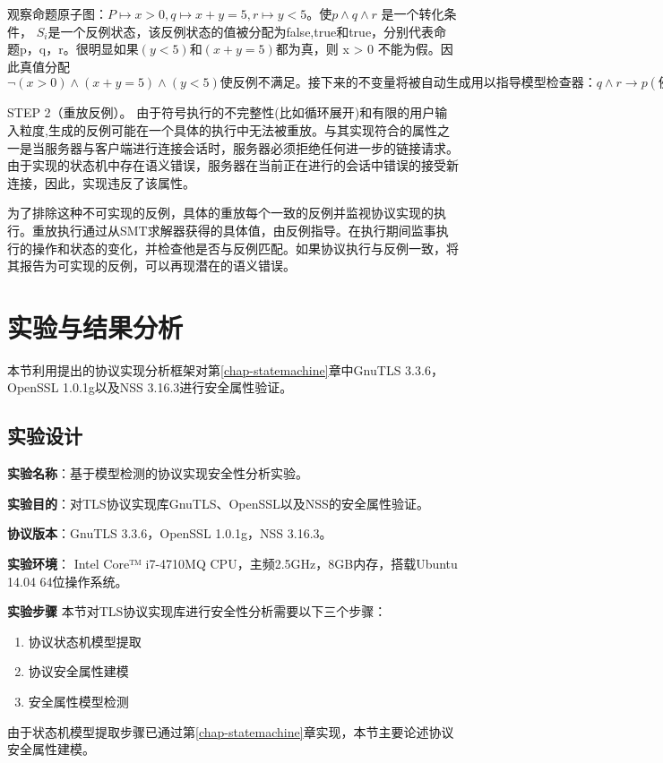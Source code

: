 观察命题原子图：$P \mapsto {x > 0}, q \mapsto {x + y = 5}, r \mapsto {y < 5}。使 p \land q \land r$ 是一个转化条件， $S_i$是一个反例状态，该反例状态的值被分配为false,true和true，分别代表命题p，q，r。很明显如果$(y < 5) 和 (x + y = 5)$都为真，则 x > 0 不能为假。因此真值分配$ \neg(x > 0)\land(x+y=5)\land(y<5)使反例不满足。接下来的不变量将被自动生成用以指导模型检查器：q \land r \to p (例如当q和r都被设置为true时，p必须被设为true)。$

STEP 2（重放反例）。 由于符号执行的不完整性(比如循环展开)和有限的用户输入粒度,生成的反例可能在一个具体的执行中无法被重放。与其实现符合的属性之一是当服务器与客户端进行连接会话时，服务器必须拒绝任何进一步的链接请求。由于实现的状态机中存在语义错误，服务器在当前正在进行的会话中错误的接受新连接，因此，实现违反了该属性。

为了排除这种不可实现的反例，具体的重放每个一致的反例并监视协议实现的执行。重放执行通过从SMT求解器获得的具体值，由反例指导。在执行期间监事执行的操作和状态的变化，并检查他是否与反例匹配。如果协议执行与反例一致，将其报告为可实现的反例，可以再现潜在的语义错误。


\section{实验与结果分析}
本节利用提出的协议实现分析框架对第\ref{chap-statemachine}章中GnuTLS 3.3.6，OpenSSL 1.0.1g以及NSS 3.16.3进行安全属性验证。
\subsection{实验设计}
\textbf{实验名称}：基于模型检测的协议实现安全性分析实验。

\textbf{实验目的}：对TLS协议实现库GnuTLS、OpenSSL以及NSS的安全属性验证。

\textbf{协议版本}：GnuTLS 3.3.6，OpenSSL 1.0.1g，NSS 3.16.3。

\textbf{实验环境}：
Intel Core™ i7-4710MQ CPU，主频2.5GHz，8GB内存，搭载Ubuntu 14.04 64位操作系统。

\textbf{实验步骤}
本节对TLS协议实现库进行安全性分析需要以下三个步骤：
\begin{enumerate}

\item 协议状态机模型提取

\item 协议安全属性建模

\item 安全属性模型检测
\end{enumerate}
由于状态机模型提取步骤已通过第\ref{chap-statemachine}章实现，本节主要论述协议安全属性建模。

